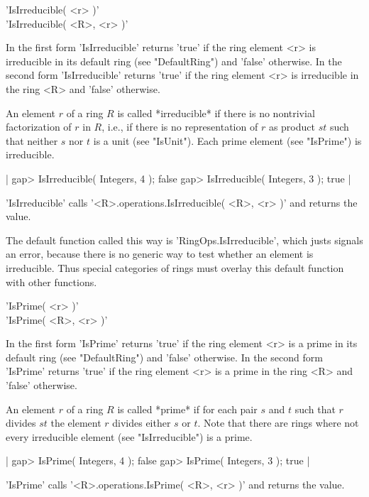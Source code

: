 
'IsIrreducible( <r> )'\\
'IsIrreducible( <R>, <r> )'

In the first form 'IsIrreducible' returns  'true' if the ring element <r>
is irreducible in  its default  ring   (see "DefaultRing")  and   'false'
otherwise.  In the second form 'IsIrreducible' returns 'true' if the ring
element <r> is irreducible in the ring <R> and 'false' otherwise.

An element  $r$  of a ring  $R$ is called  *irreducible*  if  there is no
nontrivial  factorization   of  $r$ in  $R$,    i.e., if  there     is no
representation of $r$ as product $s t$ such that neither $s$ nor $t$ is a
unit (see "IsUnit").  Each prime element (see "IsPrime") is irreducible.

|    gap> IsIrreducible( Integers, 4 );
    false
    gap> IsIrreducible( Integers, 3 );
    true |

'IsIrreducible'   calls '<R>.operations.IsIrreducible(   <R>,  <r> )' and
returns the value.

The  default function called this  way is  'RingOps.IsIrreducible', which
justs signals an error, because there is no  generic  way to test whether
an element is irreducible.  Thus special categories of rings must overlay
this default function with other functions.


'IsPrime( <r> )' \\
'IsPrime( <R>, <r> )'

In the first form 'IsPrime' returns 'true'  if the ring  element <r> is a
prime in its default ring (see "DefaultRing") and  'false' otherwise.  In
the second form 'IsPrime'  returns 'true' if  the  ring element <r>  is a
prime in the ring <R> and 'false' otherwise.

An element $r$ of a ring $R$ is called *prime* if for  each pair  $s$ and
$t$ such  that $r$ divides  $s t$ the element  $r$  divides either $s$ or
$t$.  Note that there are rings where not every  irreducible element (see
"IsIrreducible") is a prime.

|    gap> IsPrime( Integers, 4 );
    false
    gap> IsPrime( Integers, 3 );
    true |

'IsPrime' calls   '<R>.operations.IsPrime( <R>, <r>  )' and  returns  the
value.

